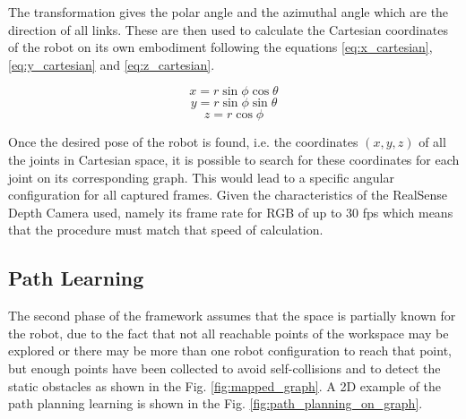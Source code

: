 \documentclass[thesis]{mas_proposal}
\begin{document}
	The transformation gives the polar angle and the azimuthal angle which are the direction of all links. These are then used to calculate the Cartesian coordinates of the robot on its own embodiment following the equations \ref{eq:x_cartesian}, \ref{eq:y_cartesian} and \ref{eq:z_cartesian}. 

\begin{equation}
	x = r \sin \phi \cos \theta
	\label{eq:x_cartesian}
\end{equation}
\begin{equation}
	y = r \sin \phi \sin \theta
	\label{eq:y_cartesian}
\end{equation}
\begin{equation}
	z = r \cos \phi
	\label{eq:z_cartesian}
\end{equation}

	Once the desired pose of the robot is found, i.e. the coordinates $(x,y,z)$ of all the joints in Cartesian space, it is possible to search for these coordinates for each joint on its corresponding graph. This would lead to a specific angular configuration for all captured frames. Given the characteristics of the RealSense Depth Camera used, namely its frame rate for RGB of up to 30 fps \cite{realsense_manual} which means that the procedure must match that speed of calculation. 

\subsection{Path Learning}

	The second phase of the framework assumes that the space is partially known for the robot, due to the fact that not all reachable points of the workspace may be explored or there may be more than one robot configuration to reach that point, but enough points have been collected to avoid self-collisions and to detect the static obstacles as shown in the Fig. \ref{fig:mapped_graph}. A 2D example of the path planning learning is shown in the Fig. \ref{fig:path_planning_on_graph}. 
\end{document}

